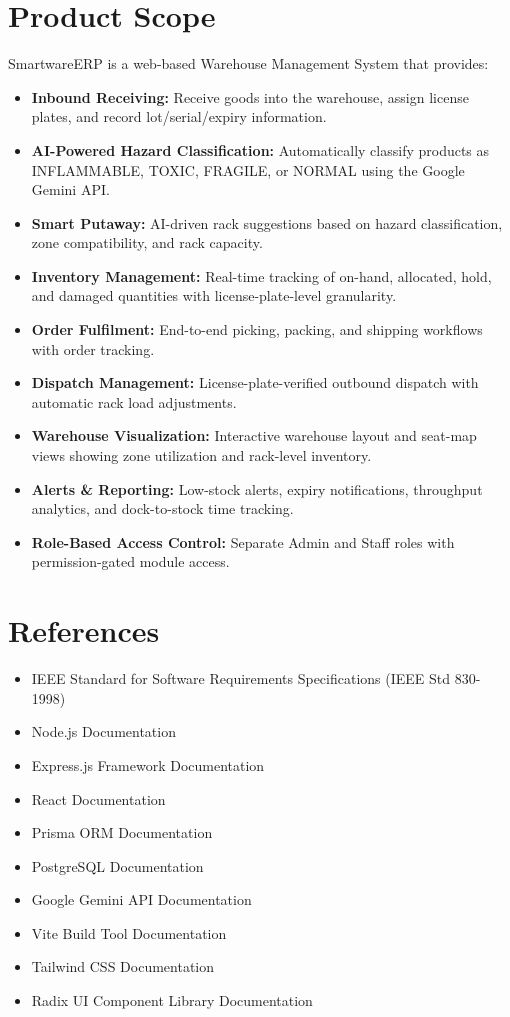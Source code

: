 \documentclass[12pt,a4paper]{report}
\begin{document}
\section{Product Scope}
SmartwareERP is a web-based Warehouse Management System that provides:
\begin{itemize}
    \item \textbf{Inbound Receiving:} Receive goods into the warehouse, assign license plates, and record lot/serial/expiry information.
    \item \textbf{AI-Powered Hazard Classification:} Automatically classify products as INFLAMMABLE, TOXIC, FRAGILE, or NORMAL using the Google Gemini API.
    \item \textbf{Smart Putaway:} AI-driven rack suggestions based on hazard classification, zone compatibility, and rack capacity.
    \item \textbf{Inventory Management:} Real-time tracking of on-hand, allocated, hold, and damaged quantities with license-plate-level granularity.
    \item \textbf{Order Fulfilment:} End-to-end picking, packing, and shipping workflows with order tracking.
    \item \textbf{Dispatch Management:} License-plate-verified outbound dispatch with automatic rack load adjustments.
    \item \textbf{Warehouse Visualization:} Interactive warehouse layout and seat-map views showing zone utilization and rack-level inventory.
    \item \textbf{Alerts \& Reporting:} Low-stock alerts, expiry notifications, throughput analytics, and dock-to-stock time tracking.
    \item \textbf{Role-Based Access Control:} Separate Admin and Staff roles with permission-gated module access.
\end{itemize}

\section{References}
\begin{itemize}
    \item IEEE Standard for Software Requirements Specifications (IEEE Std 830-1998)
    \item Node.js Documentation
    \item Express.js Framework Documentation
    \item React Documentation
    \item Prisma ORM Documentation
    \item PostgreSQL Documentation
    \item Google Gemini API Documentation
    \item Vite Build Tool Documentation
    \item Tailwind CSS Documentation
    \item Radix UI Component Library Documentation
\end{itemize}
\end{document}
